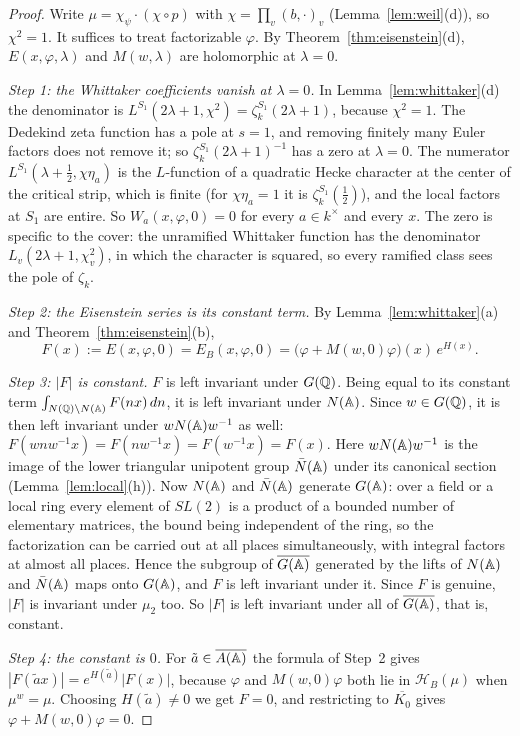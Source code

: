 \begin{proof}
Write $\mu=\chi_\psi\cdot(\chi\circ p)$ with $\chi=\prod_v(b,\cdot)_v$
(Lemma~\ref{lem:weil}(d)), so $\chi^2=1$. It suffices to treat
factorizable $\varphi$. By
Theorem~\ref{thm:eisenstein}(d), $E(x,\varphi,\lambda)$ and
$M(w,\lambda)$ are holomorphic at $\lambda=0$.

\emph{Step 1: the Whittaker coefficients vanish at $\lambda=0$.} In
Lemma~\ref{lem:whittaker}(d) the denominator is
$L^{S_1}(2\lambda+1,\chi^2)=\zeta_k^{S_1}(2\lambda+1)$, because $\chi^2=1$.
The Dedekind zeta function has a pole at $s=1$, and removing finitely
many Euler factors does not remove it; so
$\zeta_k^{S_1}(2\lambda+1)^{-1}$ has a zero at $\lambda=0$. The numerator
$L^{S_1}(\lambda+\frac12,\chi\eta_a)$ is the $L$-function of a quadratic
Hecke character at the center of the critical strip, which is finite
(for $\chi\eta_a=1$ it is $\zeta_k^{S_1}(\frac12)$), and the local factors
at $S_1$ are entire. So $W_a(x,\varphi,0)=0$ for every $a\in k^\times$ and
every $x$. The zero is specific to the cover: the unramified Whittaker
function has the denominator $L_v(2\lambda+1,\chi_v^2)$, in which the
character is squared, so every ramified class sees the pole of
$\zeta_k$.

\emph{Step 2: the Eisenstein series is its constant term.} By
Lemma~\ref{lem:whittaker}(a) and Theorem~\ref{thm:eisenstein}(b),
\[
F(x):=E(x,\varphi,0)=E_B(x,\varphi,0)=\bigl(\varphi+M(w,0)\varphi\bigr)(x)
\,e^{H(x)}.
\]

\emph{Step 3: $|F|$ is constant.} $F$ is left invariant under $G(\mathbb{Q})$.
Being equal to its constant term $\int_{N(\mathbb{Q})\backslash N(\mathbb{A})}F(nx)\,dn$,
it is left invariant under $N(\mathbb{A})$. Since $w\in G(\mathbb{Q})$, it is then left
invariant under $wN(\mathbb{A})w^{-1}$ as well: $F(wnw^{-1}x)=F(nw^{-1}x)=
F(w^{-1}x)=F(x)$. Here $wN(\mathbb{A})w^{-1}$ is the image of the lower triangular
unipotent group $\bar N(\mathbb{A})$ under its canonical section
(Lemma~\ref{lem:local}(h)). Now $N(\mathbb{A})$ and $\bar N(\mathbb{A})$ generate
$G(\mathbb{A})$: over a field or a local ring every element of $SL(2)$ is a
product of a bounded number of elementary matrices, the bound being
independent of the ring, so the factorization can be carried out at all
places simultaneously, with integral factors at almost all places. Hence
the subgroup of $\overline{G(\mathbb{A})}$ generated by the lifts of $N(\mathbb{A})$ and $\bar N(\mathbb{A})$
maps onto $G(\mathbb{A})$, and $F$ is left invariant under it. Since $F$ is
genuine, $|F|$ is invariant under $\mu_2$ too. So $|F|$ is left invariant
under all of $\overline{G(\mathbb{A})}$, that is, constant.

\emph{Step 4: the constant is $0$.} For $\tilde a\in\overline{A(\mathbb{A})}$ the
formula of Step~2 gives $|F(\tilde ax)|=e^{H(\tilde a)}|F(x)|$, because
$\varphi$ and $M(w,0)\varphi$ both lie in $\mathcal H_B(\mu)$ when
$\mu^w=\mu$. Choosing $H(\tilde a)\ne0$ we get $F=0$, and restricting to
$\overline{K_0}$ gives $\varphi+M(w,0)\varphi=0$.
\end{proof}

